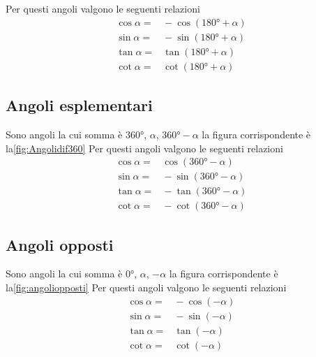 Per questi angoli valgono le seguenti relazioni
\begin{align*}
\cos\alpha=&{}-\cos(\ang{180}+\alpha)\\
\sin\alpha=&{}-\sin(\ang{180}+\alpha)\\
\tan\alpha=&{}\tan(\ang{180}+\alpha)\\
\cot\alpha=&{}\cot(\ang{180}+\alpha)
\end{align*}
\subsection{Angoli esplementari}
Sono angoli la cui somma è $\ang{360}$, $\alpha$, $\ang{360}-\alpha$ la figura corrispondente è la\nobs\vref{fig:Angolidif360}
Per questi angoli valgono le seguenti relazioni
\begin{align*}
\cos\alpha=&{}\cos(\ang{360}-\alpha)\\
\sin\alpha=&{}-\sin(\ang{360}-\alpha)\\
\tan\alpha=&{}-\tan(\ang{360}-\alpha)\\
\cot\alpha=&{}-\cot(\ang{360}-\alpha)
\end{align*}
\subsection{Angoli opposti}
Sono angoli la cui somma è $\ang{0}$, $\alpha$, $-\alpha$ la figura corrispondente è la\nobs\vref{fig:angoliopposti}
Per questi angoli valgono le seguenti relazioni
\begin{align*}
\cos\alpha=&{}-\cos(-\alpha)\\
\sin\alpha=&{}-\sin(-\alpha)\\
\tan\alpha=&{}\tan(-\alpha)\\
\cot\alpha=&{}\cot(-\alpha)
\end{align*}

